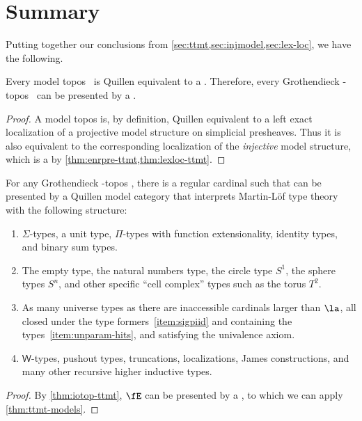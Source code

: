 \section{Summary}
\label{sec:summary}

Putting together our conclusions from \cref{sec:ttmt,sec:injmodel,sec:lex-loc}, we have the following.

\begin{thm}\label{thm:iotop-ttmt}
  Every model topos~\cite{rezk:homotopy-toposes} is Quillen equivalent to a \ttmt.
  Therefore, every Grothendieck \io-topos~\cite{lurie:higher-topoi} can be presented by a \ttmt.
\end{thm}
\begin{proof}
  A model topos is, by definition, Quillen equivalent to a left exact localization of a projective model structure on simplicial presheaves.
  Thus it is also equivalent to the corresponding localization of the \emph{injective} model structure, which is a \ttmt by \cref{thm:enrpre-ttmt,thm:lexloc-ttmt}.
\end{proof}

\begin{thm}\label{thm:models}
  For any Grothendieck \io-topos \fE, there is a regular cardinal \la such that \fE can be presented by a Quillen model category that interprets Martin-L\"{o}f type theory with the following structure:
  \begin{enumerate}
  \item $\Sigma$-types, a unit type, $\Pi$-types with function extensionality, identity types, and binary sum types.\label{item:sigpiid}
  \item The empty type, the natural numbers type, the circle type $S^1$, the sphere types $S^n$, and other specific ``cell complex'' types such as the torus $T^2$.\label{item:unparam-hits}
  \item As many universe types as there are inaccessible cardinals larger than $\la$, all closed under the type formers~\ref{item:sigpiid} and containing the types~\ref{item:unparam-hits}, and satisfying the univalence axiom.\label{item:univ}
  \item $\mathsf{W}$-types, pushout types, truncations, localizations, James constructions, and many other recursive higher inductive types.\label{item:hits}
  \end{enumerate}
\end{thm}
\begin{proof}
  By \cref{thm:iotop-ttmt}, $\fE$ can be presented by a \ttmt \E, to which we can apply \cref{thm:ttmt-models}.
\end{proof}

